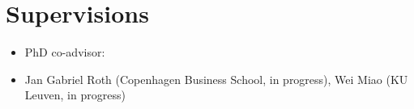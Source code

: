 \documentclass[10pt]{article}
\begin{document}
	\section*{Supervisions}
	\vspace{-0.5em}
		\begin{itemize}[leftmargin=4.5em]
		\setlength\itemsep{-0.1em}
		\item[] \hspace{-2.85em}PhD co-advisor: 
		\item[] Jan Gabriel Roth (Copenhagen Business School, in progress), Wei Miao (KU Leuven, in progress)
		\setlength\itemsep{-0.1em}
	\end{itemize}

	\vspace{-0.5em}
\end{document}
